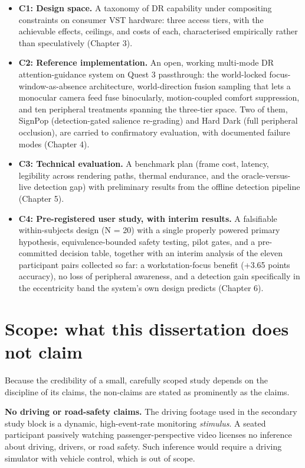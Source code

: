 \begin{itemize}
\item \textbf{C1: Design space.} A taxonomy of DR capability under compositing constraints on consumer VST
  hardware: three access tiers, with the achievable effects, ceilings, and costs of each,
  characterised empirically rather than speculatively (Chapter 3).
\item \textbf{C2: Reference implementation.} An open, working multi-mode DR attention-guidance system on
  Quest 3 passthrough: the world-locked focus-window-as-absence architecture, world-direction fusion
  sampling that lets a monocular camera feed fuse binocularly, motion-coupled comfort suppression,
  and ten peripheral treatments spanning the three-tier space. Two of them, SignPop (detection-gated
  salience re-grading) and Hard Dark (full peripheral occlusion), are carried to confirmatory
  evaluation, with documented failure modes (Chapter 4).
\item \textbf{C3: Technical evaluation.} A benchmark plan (frame cost, latency, legibility across rendering
  paths, thermal endurance, and the oracle-versus-live detection gap) with preliminary results from
  the offline detection pipeline (Chapter 5).
\item \textbf{C4: Pre-registered user study, with interim results.} A falsifiable within-subjects design
  (N = 20) with a single properly powered primary hypothesis, equivalence-bounded safety testing,
  pilot gates, and a pre-committed decision table, together with an interim analysis of the eleven
  participant pairs collected so far: a workstation-focus benefit (+3.65 points accuracy), no loss of
  peripheral awareness, and a detection gain specifically in the eccentricity band the system's own
  design predicts (Chapter 6).
\end{itemize}

\section{Scope: what this dissertation does not claim}

Because the credibility of a small, carefully scoped study depends on the discipline of its claims,
the non-claims are stated as prominently as the claims.

\textbf{No driving or road-safety claims.} The driving footage used in the secondary study block is a
dynamic, high-event-rate monitoring \textit{stimulus}. A seated participant passively watching
passenger-perspective video licenses no inference about driving, drivers, or road safety. Such
inference would require a driving simulator with vehicle control, which is out of scope.

